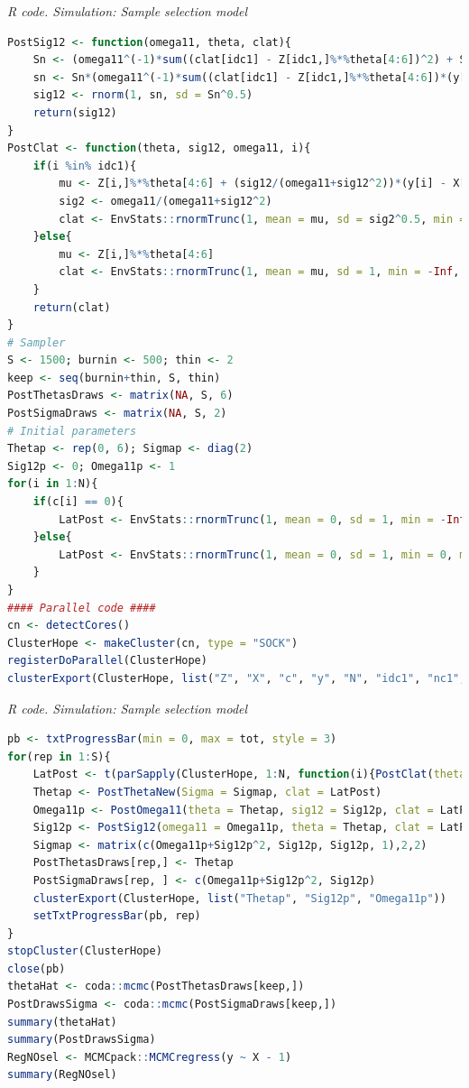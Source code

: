 \begin{tcolorbox}[enhanced,width=4.67in,center upper,
	fontupper=\large\bfseries,drop shadow southwest,sharp corners]
	\textit{R code. Simulation: Sample selection model}
	\begin{VF}
		\begin{lstlisting}[language=R]	
PostSig12 <- function(omega11, theta, clat){
	Sn <- (omega11^(-1)*sum((clat[idc1] - Z[idc1,]%*%theta[4:6])^2) + S0i)^(-1)
	sn <- Sn*(omega11^(-1)*sum((clat[idc1] - Z[idc1,]%*%theta[4:6])*(y[idc1] - X[idc1,]%*%theta[1:3])) + s0*S0i)
	sig12 <- rnorm(1, sn, sd = Sn^0.5)
	return(sig12)
}
PostClat <- function(theta, sig12, omega11, i){
	if(i %in% idc1){
		mu <- Z[i,]%*%theta[4:6] + (sig12/(omega11+sig12^2))*(y[i] - X[i,]%*%theta[1:3])
		sig2 <- omega11/(omega11+sig12^2)
		clat <- EnvStats::rnormTrunc(1, mean = mu, sd = sig2^0.5, min = 0, max = Inf)
	}else{
		mu <- Z[i,]%*%theta[4:6]
		clat <- EnvStats::rnormTrunc(1, mean = mu, sd = 1, min = -Inf, max = 0)
	}
	return(clat)
}
# Sampler
S <- 1500; burnin <- 500; thin <- 2
keep <- seq(burnin+thin, S, thin)
PostThetasDraws <- matrix(NA, S, 6)
PostSigmaDraws <- matrix(NA, S, 2)
# Initial parameters
Thetap <- rep(0, 6); Sigmap <- diag(2) 
Sig12p <- 0; Omega11p <- 1
for(i in 1:N){
	if(c[i] == 0){
		LatPost <- EnvStats::rnormTrunc(1, mean = 0, sd = 1, min = -Inf, max = 0)
	}else{
		LatPost <- EnvStats::rnormTrunc(1, mean = 0, sd = 1, min = 0, max = Inf)
	}
}
#### Parallel code ####
cn <- detectCores() 
ClusterHope <- makeCluster(cn, type = "SOCK")
registerDoParallel(ClusterHope)
clusterExport(ClusterHope, list("Z", "X", "c", "y", "N", "idc1", "nc1", "PostClat","Thetap", "Sig12p", "Omega11p"))
\end{lstlisting}
	\end{VF}
\end{tcolorbox}  

\begin{tcolorbox}[enhanced,width=4.67in,center upper,
	fontupper=\large\bfseries,drop shadow southwest,sharp corners]
	\textit{R code. Simulation: Sample selection model}
	\begin{VF}
		\begin{lstlisting}[language=R]	
pb <- txtProgressBar(min = 0, max = tot, style = 3)
for(rep in 1:S){
	LatPost <- t(parSapply(ClusterHope, 1:N, function(i){PostClat(theta = Thetap, sig12 = Sig12p, omega11 = Omega11p, i)}))
	Thetap <- PostThetaNew(Sigma = Sigmap, clat = LatPost)
	Omega11p <- PostOmega11(theta = Thetap, sig12 = Sig12p, clat = LatPost)
	Sig12p <- PostSig12(omega11 = Omega11p, theta = Thetap, clat = LatPost)
	Sigmap <- matrix(c(Omega11p+Sig12p^2, Sig12p, Sig12p, 1),2,2)
	PostThetasDraws[rep,] <- Thetap
	PostSigmaDraws[rep, ] <- c(Omega11p+Sig12p^2, Sig12p)
	clusterExport(ClusterHope, list("Thetap", "Sig12p", "Omega11p"))
	setTxtProgressBar(pb, rep)
}
stopCluster(ClusterHope)
close(pb)
thetaHat <- coda::mcmc(PostThetasDraws[keep,])
PostDrawsSigma <- coda::mcmc(PostSigmaDraws[keep,])
summary(thetaHat)
summary(PostDrawsSigma)
RegNOsel <- MCMCpack::MCMCregress(y ~ X - 1)
summary(RegNOsel)
\end{lstlisting}
	\end{VF}
\end{tcolorbox}

